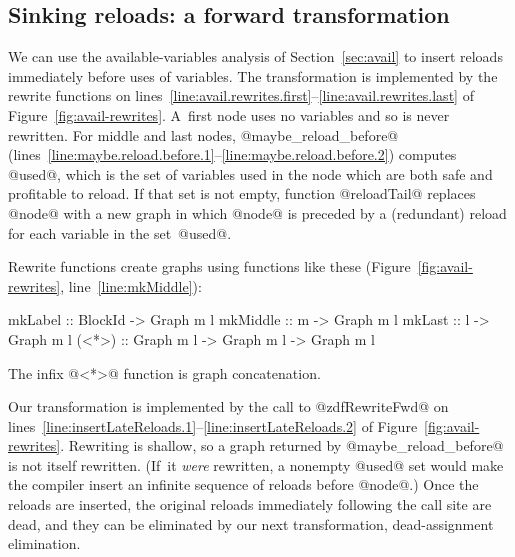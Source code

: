 \documentclass[blockstyle,preprint,natbib,nocopyrightspace]{sigplanconf}
\newcommand\lineref[1]{line~\ref{line:#1}}
\newcommand\linerangeref[2]{\mbox{lines~\ref{line:#1}--\ref{line:#2}}}
\def\authornote#1{\unskip\relax}
\newcommand{\simon}[1]{\authornote{SLPJ: #1}}
\def\finalremark#1{\relax}
\newcommand\secref[1]{Section~\ref{sec:#1}}
\newcommand\seclabel[1]{\label{sec:#1}}
\newcommand\figref[1]{Figure~\ref{fig:#1}}
\begin{document}
\subsection{Sinking reloads: a forward transformation}

\finalremark{Incidentally, I wonder if we should
use record notation when constructing @ForwardRewrites@?}

\seclabel{sink-reloads}

We can use the available-variables analysis of \secref{avail} to
insert reloads
immediately before uses of variables.
The transformation is implemented by the rewrite functions on
\linerangeref{avail.rewrites.first}{avail.rewrites.last} of \figref{avail-rewrites}.
A~first node uses no variables and so is never rewritten.
For middle and last nodes, @maybe_reload_before@ 
(\linerangeref{maybe.reload.before.1}{maybe.reload.before.2})
computes @used@, which is the set
of variables used in the node which are both safe and profitable to
reload. 
If that set is not empty, function
@reloadTail@ replaces @node@ with a new graph in which @node@ is
preceded by a (redundant) reload for each variable in the set~@used@.

Rewrite functions create graphs using functions like these
(\figref{avail-rewrites}, \lineref{mkMiddle}):
\begin{code}
mkLabel  :: BlockId -> Graph m l
mkMiddle :: m       -> Graph m l
mkLast   :: l       -> Graph m l
(<*>)    :: Graph m l -> Graph m l -> Graph m l
\end{code}
The infix @<*>@ function is graph concatenation.

Our transformation is implemented by the call to @zdfRewriteFwd@
on \linerangeref{insertLateReloads.1}{insertLateReloads.2} of \figref{avail-rewrites}.
Rewriting is shallow, so a graph returned by
@maybe_reload_before@ is not itself rewritten.
(If~it \emph{were} rewritten, a nonempty @used@ set would make the
compiler insert an infinite sequence of reloads before @node@.)
Once the reloads are inserted, the original reloads immediately
following the call site are dead, and they can be eliminated by our
next transformation, dead-assignment elimination.
\end{document}
